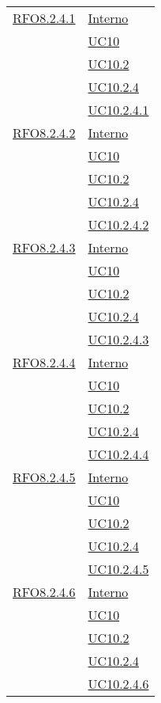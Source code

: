 \begin{longtable}{|>{\centering}m{5cm}|m{5cm}<{\centering}|}
\hyperlink{RFO8.2.4.1}{RFO8.2.4.1} 
 & \hyperlink{Interno}{Interno}\\
 & \hyperref[UC10]{UC10}\\
 & \hyperref[UC10.2]{UC10.2}\\
 & \hyperref[UC10.2.4]{UC10.2.4}\\
 & \hyperref[UC10.2.4.1]{UC10.2.4.1}\\\hline
 
 \hyperlink{RFO8.2.4.2}{RFO8.2.4.2} 
 & \hyperlink{Interno}{Interno}\\
 & \hyperref[UC10]{UC10}\\
 & \hyperref[UC10.2]{UC10.2}\\
 & \hyperref[UC10.2.4]{UC10.2.4}\\
 & \hyperref[UC10.2.4.2]{UC10.2.4.2}\\\hline
 
 \hyperlink{RFO8.2.4.3}{RFO8.2.4.3} 
 & \hyperlink{Interno}{Interno}\\
 & \hyperref[UC10]{UC10}\\
 & \hyperref[UC10.2]{UC10.2}\\
 & \hyperref[UC10.2.4]{UC10.2.4}\\
 & \hyperref[UC10.2.4.3]{UC10.2.4.3}\\\hline
 
 \hyperlink{RFO8.2.4.4}{RFO8.2.4.4} 
 & \hyperlink{Interno}{Interno}\\
 & \hyperref[UC10]{UC10}\\
 & \hyperref[UC10.2]{UC10.2}\\
 & \hyperref[UC10.2.4]{UC10.2.4}\\
 & \hyperref[UC10.2.4.4]{UC10.2.4.4}\\\hline
 
 \hyperlink{RFO8.2.4.5}{RFO8.2.4.5} 
 & \hyperlink{Interno}{Interno}\\
 & \hyperref[UC10]{UC10}\\
 & \hyperref[UC10.2]{UC10.2}\\
 & \hyperref[UC10.2.4]{UC10.2.4}\\
 & \hyperref[UC10.2.4.5]{UC10.2.4.5}\\\hline
 
 \hyperlink{RFO8.2.4.6}{RFO8.2.4.6} 
 & \hyperlink{Interno}{Interno}\\
 & \hyperref[UC10]{UC10}\\
 & \hyperref[UC10.2]{UC10.2}\\
 & \hyperref[UC10.2.4]{UC10.2.4}\\
 & \hyperref[UC10.2.4.6]{UC10.2.4.6}\\\hline
 

\end{longtable}
